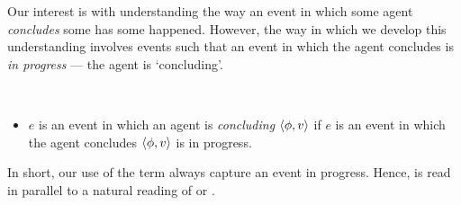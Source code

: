 \begin{note}
  Our interest is with understanding the way an event in which some agent \emph{concludes} some  has some  happened.
  However, the way in which we develop this understanding involves events such that an event in which the agent concludes is \emph{in progress} --- the agent is `concluding'.

  \begin{definition}
    \label{def:conclusionE}
    \mbox{ }
    \vspace{-\baselineskip}
    \begin{itemize}
    \item
      \(e\) is an event in which an agent is \emph{concluding} \(\langle \phi, v \rangle\) if \(e\) is an event in which the agent concludes \(\langle \phi, v \rangle\) is in progress.
    \end{itemize}
    \vspace{-\baselineskip}
  \end{definition}

  \noindent%
  In short, our use of the term  always capture an event in progress.
  Hence,  is read in parallel to a natural reading of  or .
\end{note}


